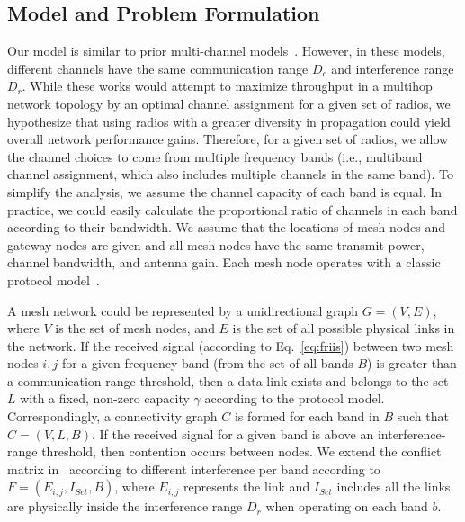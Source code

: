 \subsection{Model and Problem Formulation}
\label{subsec:problem}

Our model is similar to prior multi-channel models~\cite{tang2005interference,
yuan2006cross,si2010overview}. However, in these models, different channels
have the same communication range $D_c$ and interference range $D_r$.  While
these works would attempt to maximize throughput in a multihop network topology
by an optimal channel assignment for a given set of radios, we hypothesize that
using radios with a greater diversity in propagation could yield overall network 
performance gains.  
Therefore, for a given set of radios, we allow the channel
choices to come from multiple frequency bands (i.e., multiband channel assignment, which also includes multiple channels in the same band).
To simplify the analysis, we assume the channel capacity of each band is equal.
In practice, we could easily calculate the proportional ratio of channels in 
each band according to their bandwidth.
We assume that the locations of mesh nodes and gateway nodes are given and
all mesh nodes have the same transmit power, channel bandwidth, and antenna gain.
Each mesh node operates with a classic protocol model~\cite{gupta2000capacity}. 

A mesh network could be represented by a unidirectional graph $G=(V,E)$, where
$V$ is the set of mesh nodes, and $E$ is the set of all possible physical links 
in the network. If the received signal (according to Eq.~\ref{eq:friis}) between 
two mesh nodes $i,j$ for a given frequency band (from the set of all bands $B$) 
is greater than a communication-range threshold, then a data link exists and 
belongs to the set $L$ with a fixed, non-zero capacity $\gamma$ according to the protocol 
model.  Correspondingly, a connectivity graph $C$ is formed for each 
band in $B$ such that $C=(V,L,B)$.  If the received signal for a given band is 
above an interference-range threshold, then contention occurs between
nodes.  We extend the conflict matrix in~\cite{tang2005interference} according to
different interference per band according to $F=(E_{i,j},I_{Set},B)$, where $E_{i,j}$
represents the link and $I_{Set}$ includes all the links are physically inside 
the interference range $D_r$ when operating on each band $b$.

